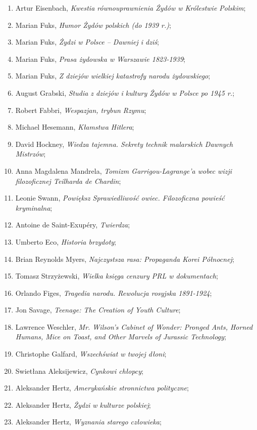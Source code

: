 \documentclass[a4paper,11pt]{article}
\begin{document}
\begin{enumerate}
{    XVIII i XIX w.};
\item Artur Eisenbach, \emph{Kwestia równouprawnienia Żydów w
    Królestwie Polskim};
\item Marian Fuks, \emph{Humor Żydów polskich (do 1939 r.)};
\item Marian Fuks, \emph{Żydzi w Polsce – Dawniej i dziś};
\item Marian Fuks, \emph{Prasa żydowska w Warszawie 1823-1939};
\item Marian Fuks, \emph{Z dziejów wielkiej katastrofy narodu
    żydowskiego};
\item August Grabski, \emph{Studia z dziejów i kultury Żydów w Polsce
    po 1945 r.};
\item Robert Fabbri, \emph{Wespazjan, trybun Rzymu};
\item Michael Hesemann, \emph{Kłamstwa Hitlera};
\item David Hockney, \emph{Wiedza tajemna. Sekrety technik malarskich
    Dawnych Mistrzów};
\item Anna Magdalena Mandrela, \emph{Tomizm Garrigou-Lagrange’a wobec
    wizji filozoficznej Teilharda de Chardin};
\item Leonie Swann, \emph{Powiększ Sprawiedliwość owiec. Filozoficzna
    powieść kryminalna};
\item Antoine de Saint-Exupéry, \emph{Twierdza};
\item Umberto Eco, \emph{Historia brzydoty};
\item Brian Reynolds Myers, \emph{Najczystsza rasa: Propaganda Korei
    Północnej};
\item Tomasz Strzyżewski, \emph{Wielka księga cenzury PRL w
    dokumentach};
\item Orlando Figes, \emph{Tragedia narodu. Rewolucja rosyjska
    1891-1924};
\item Jon Savage, \emph{Teenage: The Creation of Youth Culture};
\item Lawrence Weschler, \emph{Mr. Wilson's Cabinet of Wonder: Pronged
    Ants, Horned Humans, Mice on Toast, and Other Marvels of Jurassic
    Technology};
\item Christophe Galfard, \emph{Wszechświat w twojej dłoni};
\item Swietłana Aleksijewicz, \emph{Cynkowi chłopcy};
\item Aleksander Hertz, \emph{Amerykańskie stronnictwa polityczne};
\item Aleksander Hertz, \emph{Żydzi w kulturze polskiej};
\item Aleksander Hertz, \emph{Wyznania starego człowieka};

\end{enumerate}
\end{document}

